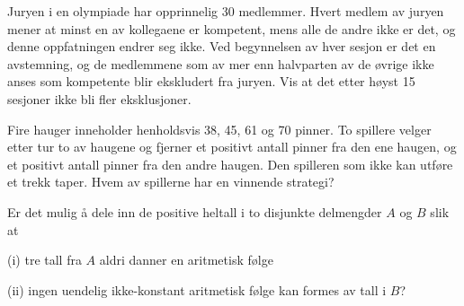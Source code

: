 \prob %
Juryen i en olympiade har opprinnelig 30 medlemmer.              
Hvert medlem av juryen mener at minst en av kollegaene er kompetent, mens
alle de andre ikke er det, og denne oppfatningen endrer seg ikke.
Ved begynnelsen av hver sesjon er det en avstemning, og de medlemmene
som av mer enn halvparten av de \o{}vrige ikke anses som kompetente
blir ekskludert fra juryen.
Vis at det etter h\o{}yst 15 sesjoner ikke bli fler eksklusjoner.





\prob %
Fire hauger inneholder henholdsvis 38, 45, 61 og 70 pinner. To spillere
velger etter tur to av haugene og fjerner et positivt antall pinner
fra den ene haugen, og et positivt antall pinner fra den andre haugen.
Den spilleren som ikke kan utf\o{}re et trekk taper.
Hvem av spillerne har en vinnende strategi?




\prob %
Er det mulig {\aa} dele inn de positive heltall i to disjunkte delmengder $A$
og $B$ slik at

\item{(i)} tre tall fra $A$ aldri danner en aritmetisk f\o{}lge

\item{(ii)} ingen uendelig ikke-konstant aritmetisk f\o{}lge kan formes
av tall i $B$?


\bye
